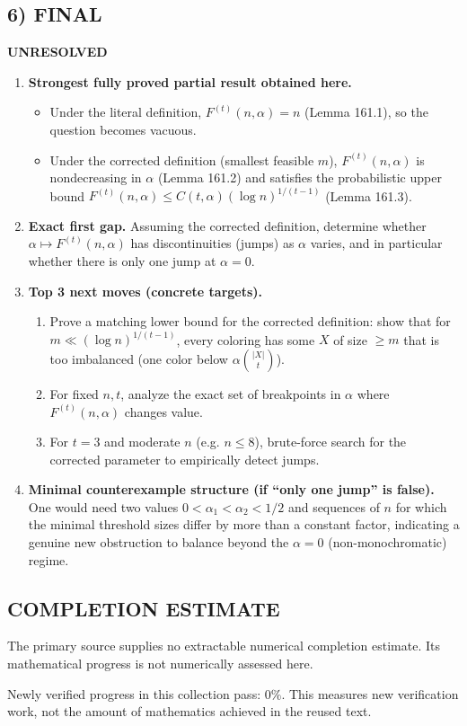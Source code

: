 \subsection*{6) FINAL}
\textbf{UNRESOLVED}

\begin{enumerate}
\item[(i)] \textbf{Strongest fully proved partial result obtained here.}
\begin{itemize}
\item Under the literal definition, $F^{(t)}(n,\alpha)=n$ (Lemma 161.1), so the question becomes vacuous.
\item Under the corrected definition (smallest feasible $m$), $F^{(t)}(n,\alpha)$ is nondecreasing in $\alpha$ (Lemma 161.2) and satisfies the probabilistic upper bound $F^{(t)}(n,\alpha)\le C(t,\alpha)(\log n)^{1/(t-1)}$ (Lemma 161.3).
\end{itemize}

\item[(ii)] \textbf{Exact first gap.}
Assuming the corrected definition, determine whether $\alpha\mapsto F^{(t)}(n,\alpha)$ has discontinuities (jumps) as $\alpha$ varies, and in particular whether there is only one jump at $\alpha=0$.

\item[(iii)] \textbf{Top 3 next moves (concrete targets).}
\begin{enumerate}
\item Prove a matching lower bound for the corrected definition: show that for $m\ll (\log n)^{1/(t-1)}$, every coloring has some $X$ of size $\ge m$ that is too imbalanced (one color below $\alpha\binom{|X|}{t}$).
\item For fixed $n,t$, analyze the exact set of breakpoints in $\alpha$ where $F^{(t)}(n,\alpha)$ changes value.
\item For $t=3$ and moderate $n$ (e.g. $n\le 8$), brute-force search for the corrected parameter to empirically detect jumps.
\end{enumerate}

\item[(iv)] \textbf{Minimal counterexample structure (if ``only one jump'' is false).}
One would need two values $0<\alpha_1<\alpha_2<1/2$ and sequences of $n$ for which the minimal threshold sizes differ by more than a constant factor, indicating a genuine new obstruction to balance beyond the $\alpha=0$ (non-monochromatic) regime.
\end{enumerate}




\subsection*{COMPLETION ESTIMATE}
The primary source supplies no extractable numerical completion estimate. Its mathematical progress is not numerically assessed here.

Newly verified progress in this collection pass: $0\%$. This measures new verification work, not the amount of mathematics achieved in the reused text.
